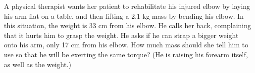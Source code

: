 A physical therapist wants her patient to rehabilitate
his injured elbow by laying his arm flat on a table, and
then lifting a 2.1 kg mass by bending his elbow. In this
situation, the weight is 33 cm from his elbow. He calls her
back, complaining that it hurts him to grasp the weight. He
asks if he can strap a bigger weight onto his arm, only 17
cm from his elbow. How much mass should she tell him to use
so that he will be exerting the same torque? (He is raising
his forearm itself, as well as the weight.) \answercheck
